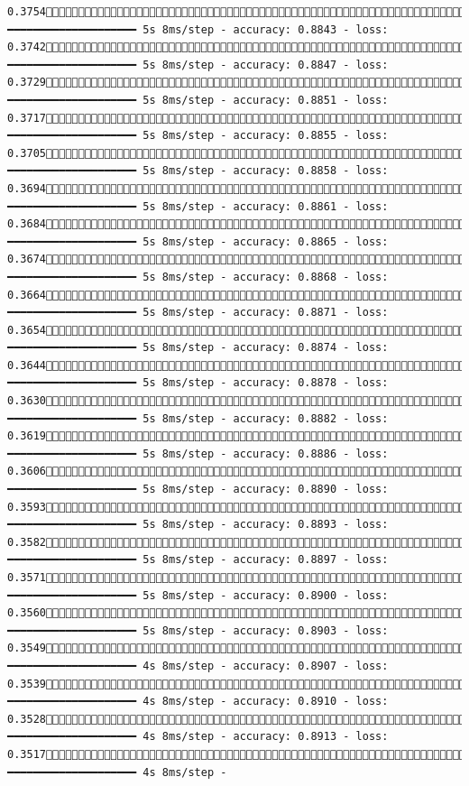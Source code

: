 \documentclass[
  letterpaper,
  DIV=11,
  numbers=noendperiod]{scrreprt}
\begin{document}
\begin{verbatim}
0.37541150/1875 ━━━━━━━━━━━━━━━━━━━━ 5s 8ms/step - accuracy: 0.8843 - loss: 0.37421157/1875 ━━━━━━━━━━━━━━━━━━━━ 5s 8ms/step - accuracy: 0.8847 - loss: 0.37291164/1875 ━━━━━━━━━━━━━━━━━━━━ 5s 8ms/step - accuracy: 0.8851 - loss: 0.37171171/1875 ━━━━━━━━━━━━━━━━━━━━ 5s 8ms/step - accuracy: 0.8855 - loss: 0.37051177/1875 ━━━━━━━━━━━━━━━━━━━━ 5s 8ms/step - accuracy: 0.8858 - loss: 0.36941183/1875 ━━━━━━━━━━━━━━━━━━━━ 5s 8ms/step - accuracy: 0.8861 - loss: 0.36841189/1875 ━━━━━━━━━━━━━━━━━━━━ 5s 8ms/step - accuracy: 0.8865 - loss: 0.36741195/1875 ━━━━━━━━━━━━━━━━━━━━ 5s 8ms/step - accuracy: 0.8868 - loss: 0.36641201/1875 ━━━━━━━━━━━━━━━━━━━━ 5s 8ms/step - accuracy: 0.8871 - loss: 0.36541207/1875 ━━━━━━━━━━━━━━━━━━━━ 5s 8ms/step - accuracy: 0.8874 - loss: 0.36441215/1875 ━━━━━━━━━━━━━━━━━━━━ 5s 8ms/step - accuracy: 0.8878 - loss: 0.36301222/1875 ━━━━━━━━━━━━━━━━━━━━ 5s 8ms/step - accuracy: 0.8882 - loss: 0.36191230/1875 ━━━━━━━━━━━━━━━━━━━━ 5s 8ms/step - accuracy: 0.8886 - loss: 0.36061238/1875 ━━━━━━━━━━━━━━━━━━━━ 5s 8ms/step - accuracy: 0.8890 - loss: 0.35931245/1875 ━━━━━━━━━━━━━━━━━━━━ 5s 8ms/step - accuracy: 0.8893 - loss: 0.35821252/1875 ━━━━━━━━━━━━━━━━━━━━ 5s 8ms/step - accuracy: 0.8897 - loss: 0.35711259/1875 ━━━━━━━━━━━━━━━━━━━━ 5s 8ms/step - accuracy: 0.8900 - loss: 0.35601266/1875 ━━━━━━━━━━━━━━━━━━━━ 5s 8ms/step - accuracy: 0.8903 - loss: 0.35491273/1875 ━━━━━━━━━━━━━━━━━━━━ 4s 8ms/step - accuracy: 0.8907 - loss: 0.35391280/1875 ━━━━━━━━━━━━━━━━━━━━ 4s 8ms/step - accuracy: 0.8910 - loss: 0.35281287/1875 ━━━━━━━━━━━━━━━━━━━━ 4s 8ms/step - accuracy: 0.8913 - loss: 0.35171294/1875 ━━━━━━━━━━━━━━━━━━━━ 4s 8ms/step - 
\end{verbatim}
\end{document}
